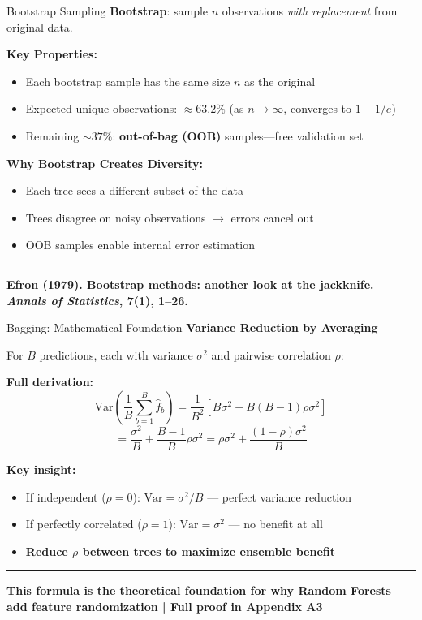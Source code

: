 \documentclass[8pt,aspectratio=169]{beamer}
\newcommand{\bottomnote}[1]{%
\vfill
\vspace{-2mm}
\textcolor{mllavender2}{\rule{\textwidth}{0.4pt}}
\vspace{1mm}
\footnotesize
\textbf{#1}
}
\newcommand{\highlight}[1]{\textcolor{mlorange}{\textbf{#1}}}
\begin{document}
\begin{frame}[t]{Bootstrap Sampling}
\textbf{Bootstrap}: sample $n$ observations \textit{with replacement} from original data.

\vspace{0.5em}
\textbf{Key Properties:}
\begin{itemize}
\item Each bootstrap sample has the same size $n$ as the original
\item Expected unique observations: $\approx 63.2\%$ (as $n \to \infty$, converges to $1 - 1/e$)
\item Remaining $\sim 37\%$: \textbf{out-of-bag (OOB)} samples---free validation set
\end{itemize}

\vspace{0.5em}
\textbf{Why Bootstrap Creates Diversity:}
\begin{itemize}
\item Each tree sees a different subset of the data
\item Trees disagree on noisy observations $\rightarrow$ errors cancel out
\item OOB samples enable internal error estimation
\end{itemize}
\bottomnote{Efron (1979). Bootstrap methods: another look at the jackknife. \textit{Annals of Statistics}, 7(1), 1--26.}
\end{frame}

\begin{frame}[t]{Bagging: Mathematical Foundation}
\textbf{Variance Reduction by Averaging}

For $B$ predictions, each with variance $\sigma^2$ and pairwise correlation $\rho$:

\vspace{0.3em}
\textbf{Full derivation:}
\[
\text{Var}\!\left(\frac{1}{B}\sum_{b=1}^{B} \hat{f}_b\right) = \frac{1}{B^2}\left[B\sigma^2 + B(B-1)\rho\sigma^2\right]
\]
\[
= \frac{\sigma^2}{B} + \frac{B-1}{B}\rho\sigma^2 = \rho\sigma^2 + \frac{(1-\rho)\sigma^2}{B}
\]

\vspace{0.3em}
\textbf{Key insight:}
\begin{itemize}
\item If independent ($\rho = 0$): $\text{Var} = \sigma^2/B$ --- perfect variance reduction
\item If perfectly correlated ($\rho = 1$): $\text{Var} = \sigma^2$ --- no benefit at all
\item \highlight{Reduce $\rho$ between trees to maximize ensemble benefit}
\end{itemize}
\bottomnote{This formula is the theoretical foundation for why Random Forests add feature randomization | Full proof in Appendix A3}
\end{frame}
\end{document}
